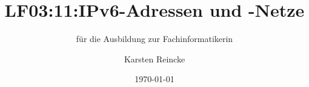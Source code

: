 \documentclass[]{beamer}
\title{LF03:11:IPv6-Adressen und -Netze}
\subtitle{für die Ausbildung zur Fachinformatikerin}
\institute[GS-LDK]{Gewerbliche Schulen Dillenburg}
\author{Karsten Reincke}
\date{\today}
\def\cfgGl{../../../cfg.gl/}
\begin{document}

\begin{frame}
  \titlepage

  
\end{frame}






\logo{}
\newpage



%
\end{document}
